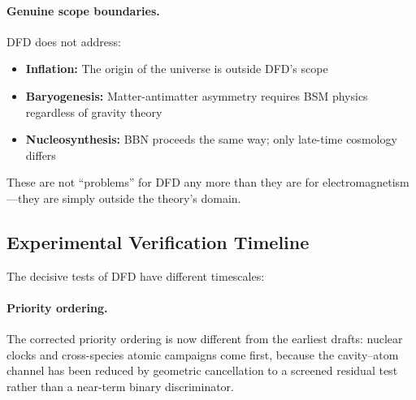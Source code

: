 \paragraph{Genuine scope boundaries.}
DFD does not address:
\begin{itemize}
\item \textbf{Inflation:} The origin of the universe is outside DFD's scope
\item \textbf{Baryogenesis:} Matter-antimatter asymmetry requires BSM physics regardless of gravity theory
\item \textbf{Nucleosynthesis:} BBN proceeds the same way; only late-time cosmology differs
\end{itemize}

These are not ``problems'' for DFD any more than they are for electromagnetism---they are simply outside the theory's domain.

\subsection{Experimental Verification Timeline}\label{sec:open-timeline}

The decisive tests of DFD have different timescales:

\begin{table}[h]
\centering
\caption{Experimental verification timeline.}\label{tab:timeline-open}
\end{table}

\paragraph{Priority ordering.}
The corrected priority ordering is now different from the earliest drafts: nuclear clocks and cross-species atomic campaigns come first, because the cavity--atom channel has been reduced by geometric cancellation to a screened residual test rather than a near-term binary discriminator.

